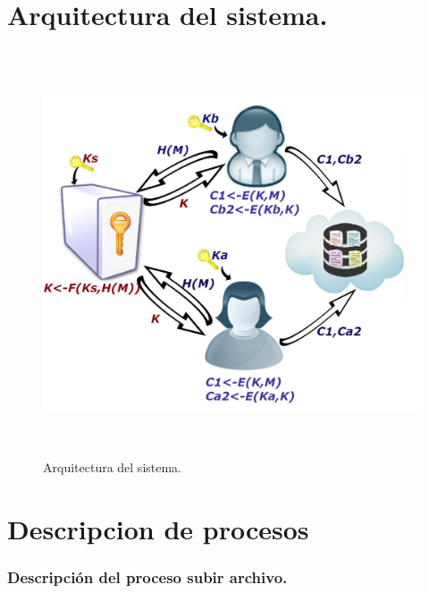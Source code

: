 

\section{Arquitectura del sistema. }
\begin{figure}[H]
\centering
	\includegraphics[width=16cm, height=12cm]{./images/Arquitectura.jpg}
	\caption{Arquitectura del sistema.}

\end{figure}

\section{Descripcion de procesos}

\subsubsection{Descripción del proceso subir archivo.}


